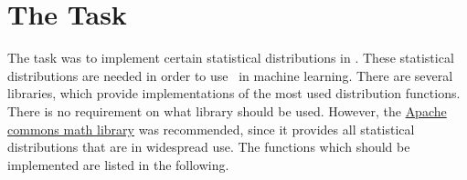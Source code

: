 
\chapter*{The Task}

	The task was to implement certain statistical distributions in \setlx. These statistical distributions are needed in order to use \setlx\ in machine learning. There are several libraries, which provide implementations of the most used distribution functions. There is no requirement on what library should be used. However, the \href{http://commons.apache.org/proper/commons-math/index.html}{Apache commons math library} was recommended, since it provides all statistical distributions that are in widespread use. The functions which should be implemented are listed in the following.

